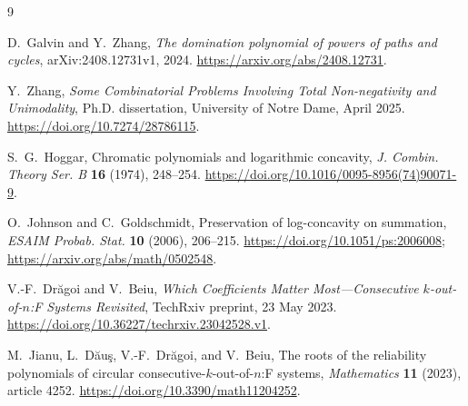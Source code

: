 \documentclass[11pt]{article}
\theoremstyle{definition}
\theoremstyle{remark}
\begin{document}
\begin{thebibliography}{9}

D.~Galvin and Y.~Zhang,
\emph{The domination polynomial of powers of paths and cycles},
arXiv:2408.12731v1, 2024.
\url{https://arxiv.org/abs/2408.12731}.

Y.~Zhang,
\emph{Some Combinatorial Problems Involving Total Non-negativity and
Unimodality}, Ph.D. dissertation, University of Notre Dame, April 2025.
\url{https://doi.org/10.7274/28786115}.

S.~G.~Hoggar,
Chromatic polynomials and logarithmic concavity,
\emph{J. Combin. Theory Ser. B} \textbf{16} (1974), 248--254.
\url{https://doi.org/10.1016/0095-8956(74)90071-9}.

O.~Johnson and C.~Goldschmidt,
Preservation of log-concavity on summation,
\emph{ESAIM Probab. Stat.} \textbf{10} (2006), 206--215.
\url{https://doi.org/10.1051/ps:2006008};
\url{https://arxiv.org/abs/math/0502548}.

V.-F.~Dr\u{a}goi and V.~Beiu,
\emph{Which Coefficients Matter Most---Consecutive
$k$-out-of-$n$:F Systems Revisited}, TechRxiv preprint, 23 May 2023.
\url{https://doi.org/10.36227/techrxiv.23042528.v1}.

M.~Jianu, L.~D\u{a}u\c{s}, V.-F.~Dr\u{a}goi, and V.~Beiu,
The roots of the reliability polynomials of circular
consecutive-$k$-out-of-$n$:F systems,
\emph{Mathematics} \textbf{11} (2023), article 4252.
\url{https://doi.org/10.3390/math11204252}.

\end{thebibliography}
\end{document}
